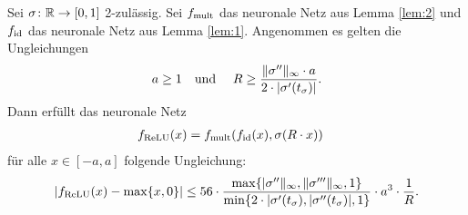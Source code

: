   \begin{lem}
  \label{lem:3}
  Sei $\sigma\colon \mathbb{R} \to [0, 1]$ 2-zulässig. Sei $f_{\mathrm{mult}}$ das neuronale Netz aus Lemma \ref{lem:2} und $f_{\mathrm{id}}$ das neuronale Netz aus Lemma \ref{lem:1}. Angenommen es gelten die Ungleichungen 
\begin{equation}
\label{lem:3:Vor1}   
  a \geq 1 \text{\quad und \quad} R \geq \frac{\|\sigma''\|_{\infty} \cdot a}{2 \cdot |\sigma'(t_{\sigma})|}.
\end{equation}
  Dann erfüllt das neuronale Netz 
  \begin{equation}
  \label{lem:3:Vor2}
  \begin{split}
  f_{\mathrm{ReLU}}(x) & = f_{\mathrm{mult}}(f_{\mathrm{id}}(x), \sigma(R \cdot x)) 
  \end{split}
  \end{equation}
 für alle $x \in [-a, a]$ folgende Ungleichung:
 $$|f_{\mathrm{ReLU}}(x) - \max\{x, 0\}| \leq 56 \cdot \frac{\max\{|\sigma''\|_{\infty}, \|\sigma'''\|_{\infty}, 1\}}{\min\{2 \cdot |\sigma'(t_{\sigma}), |\sigma''(t_{\sigma})|, 1\}} \cdot a^3 \cdot \frac{1}{R}.$$
  \end{lem}
